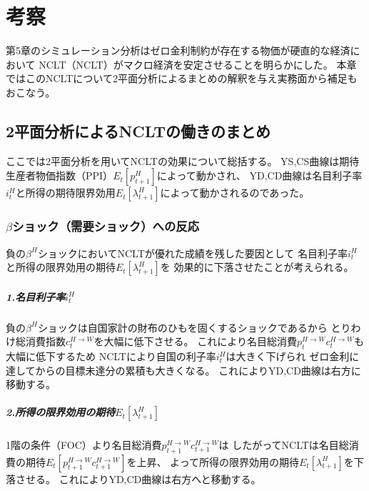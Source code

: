 
\chapter{考察}
\label{chap:chapter6}
第5章のシミュレーション分析はゼロ金利制約が存在する物価が硬直的な経済において
NCLT（NCLT）がマクロ経済を安定させることを明らかにした。
本章ではこのNCLTについて2平面分析によるまとめの解釈を与え実務面から補足もおこなう。

\section{2平面分析によるNCLTの働きのまとめ}
\label{sec:discussion_as_ad}
ここでは2平面分析を用いてNCLTの効果について総括する。
YS,CS曲線は期待生産者物価指数（PPI）\(E_t[p_{t+1}^H]\)によって動かされ、
YD,CD曲線は名目利子率\(i_t^H\)と所得の期待限界効用\(E_t[\lambda_{t+1}^H]\)によって動かされるのであった。

\subsection{\(\beta\)ショック（需要ショック）への反応}
\label{sec:discussion_as_ad_beta_shock}
負の\(\beta^H\)ショックにおいてNCLTが優れた成績を残した要因として
名目利子率\(i_t^H\)と所得の限界効用の期待\(E_t[\lambda_{t+1}^H]\)を
効果的に下落させたことが考えられる。

\paragraph{1.名目利子率\(i_t^H\)}
\label{sec:discussion_as_ad_beta_shock_interest}
負の\(\beta^H\)ショックは自国家計の財布のひもを固くするショックであるから
とりわけ総消費指数\(c_t^{H\to W}\)を大幅に低下させる。
これにより名目総消費\(p_t^{H\to W}c_t^{H\to W}\)も大幅に低下するため
NCLTにより自国の利子率\(i_t^H\)は大きく下げられ
ゼロ金利に達してからの目標未達分の累積も大きくなる。
これによりYD,CD曲線は右方に移動する。
\paragraph{2.所得の限界効用の期待\(E_t[\lambda_{t+1}^H]\)}
\label{sec:discussion_as_ad_beta_shock_mu}
1階の条件（FOC）より名目総消費\(p_{t+1}^{H\to W}c_{t+1}^{H\to W}\)は
したがってNCLTは名目総消費の期待\(E_t[p_{t+1}^{H\to W}c_{t+1}^{H\to W}]\)を上昇、
よって所得の限界効用の期待\(E_t[\lambda_{t+1}^H]\)を下落させる。
これによりYD,CD曲線は右方へと移動する。
